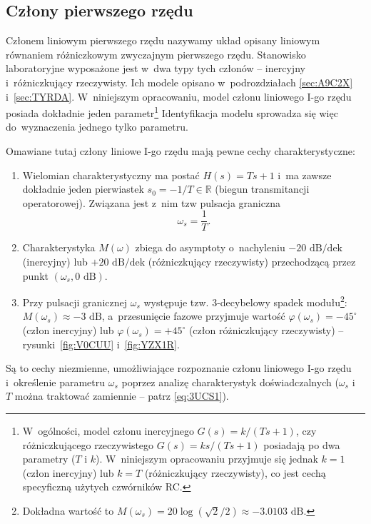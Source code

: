 \documentclass[paper=a4,DIV=12]{lpas}
\newcommand{\degree}{^{\circ}}
\begin{document}
\begin{appendices}
  \subsection{Człony pierwszego rzędu}
  \label{sec:LDB7J}

  Członem liniowym pierwszego rzędu nazywamy układ opisany liniowym równaniem
  różniczkowym zwyczajnym pierwszego rzędu. Stanowisko laboratoryjne wyposażone
  jest w~dwa typy tych członów -- inercyjny i~różniczkujący rzeczywisty. Ich
  modele opisano w~podrozdziałach \ref{sec:A9C2X} i~\ref{sec:TYRDA}.
  W~niniejszym opracowaniu, model członu liniowego I-go rzędu posiada dokładnie
  jeden parametr\footnote{W~ogólności, model członu inercyjnego $G(s) = k/(Ts +
  1)$, czy różniczkującego rzeczywistego $G(s) = ks/(Ts + 1)$ posiadają po dwa
  parametry ($T$ i $k$). W~niniejszym opracowaniu przyjmuje się jednak $k = 1$
  (człon inercyjny) lub $k=T$ (różniczkujący rzeczywisty), co jest cechą
  specyficzną użytych czwórników RC.} Identyfikacja modelu sprowadza się więc
  do~wyznaczenia jednego tylko parametru.

  Omawiane tutaj człony liniowe I-go rzędu mają pewne cechy charakterystyczne:
  \begin{enumerate}
    \item Wielomian charakterystyczny ma postać $H(s) = Ts+1$ i~ma zawsze
      dokładnie jeden pierwiastek $s_0 = -1/T \in \mathbb{R}$ (biegun
      transmitancji operatorowej). Związana jest z~nim tzw pulsacja graniczna
      \begin{equation}
        \omega_s = \frac{1}{T}.
        \label{eq:3UCS1}
      \end{equation}
    \item Charakterystyka $M(\omega)$ zbiega do asymptoty o~nachyleniu
      $-20\text{ dB/dek}$ (inercyjny) lub $+20\text{ dB/dek}$ (różniczkujący
      rzeczywisty) przechodzącą przez punkt $(\omega_s,0\text{ dB})$.
    \item Przy pulsacji granicznej $\omega_s$ występuje tzw. 3-decybelowy spadek
      modułu\footnote{Dokładna wartość to $M(\omega_s) = 20 \log{(\sqrt{2}/2)}
      \approx -3.0103\text{ dB}$.}: $M(\omega_s) \approx -3\text{ dB}$,
      a~przesunięcie fazowe przyjmuje wartość $\varphi(\omega_s) = -45\degree$
      (człon inercyjny) lub $\varphi(\omega_s) = +45\degree$ (człon
      różniczkujący rzeczywisty) -- rysunki~\ref{fig:V0CUU} i~\ref{fig:YZX1R}.
  \end{enumerate}
  Są to cechy niezmienne, umożliwiające rozpoznanie członu liniowego I-go rzędu
  i~określenie parametru $\omega_s$ poprzez analizę charakterystyk
  doświadczalnych ($\omega_s$ i~$T$ można traktować zamiennie -- patrz \eqref{eq:3UCS1}).


\end{appendices}
\end{document}
